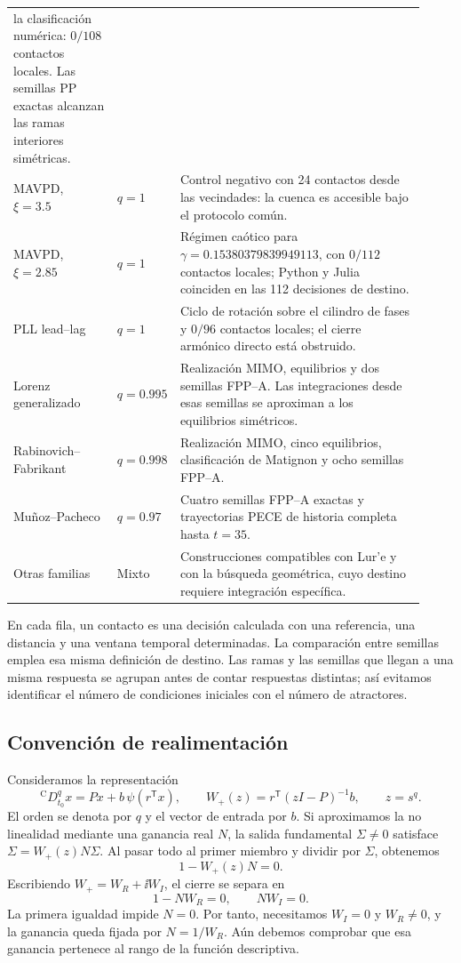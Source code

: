 \begin{longtable}{@{}L{0.25\linewidth}C{0.08\linewidth}L{0.59\linewidth}@{}}
la clasificación numérica: \(0/108\) contactos locales. Las semillas PP
exactas alcanzan las ramas interiores simétricas.\\
MAVPD, \(\xi=3.5\) & \(q=1\) & Control negativo con 24 contactos desde las
vecindades: la cuenca es accesible bajo el protocolo común.\\
MAVPD, \(\xi=2.85\) & \(q=1\) & Régimen caótico para
\(\gamma=0.15380379839949113\), con \(0/112\) contactos locales;
Python y Julia coinciden en las 112 decisiones de destino.\\
PLL lead--lag & \(q=1\) & Ciclo de rotación sobre el cilindro de fases y
\(0/96\) contactos locales; el cierre armónico directo está obstruido.\\
Lorenz generalizado & \(q=0.995\) & Realización MIMO, equilibrios y dos
semillas FPP--A. Las integraciones desde esas semillas se aproximan a los
equilibrios simétricos.\\
Rabinovich--Fabrikant & \(q=0.998\) & Realización MIMO, cinco equilibrios,
clasificación de Matignon y ocho semillas FPP--A.\\
Muñoz--Pacheco & \(q=0.97\) & Cuatro semillas FPP--A exactas y
trayectorias PECE de historia completa hasta \(t=35\).\\
Otras familias & Mixto & Construcciones compatibles con Lur'e y con la
búsqueda geométrica, cuyo destino requiere integración específica.\\
\bottomrule
\end{longtable}

En cada fila, un contacto es una decisión calculada con una referencia,
una distancia y una ventana temporal determinadas. La comparación entre
semillas emplea esa misma definición de destino. Las ramas y las semillas
que llegan a una misma respuesta se agrupan antes de contar respuestas
distintas; así evitamos identificar el número de condiciones iniciales con
el número de atractores.

\subsection{Convención de realimentación}

Consideramos la representación
\begin{equation}
 {}^{\mathrm C}D_{t_0}^{q}x=Px+b\,\psi(r^{\mathsf T}x),\qquad
 W_+(z)=r^{\mathsf T}(zI-P)^{-1}b,\qquad z=s^q.
 \label{eq:master-wplus}
\end{equation}
El orden se denota por \(q\) y el vector de entrada por \(b\). Si aproximamos
la no linealidad mediante una ganancia real \(N\), la salida fundamental
\(\Sigma\ne0\) satisface \(\Sigma=W_+(z)N\Sigma\). Al pasar todo al
primer miembro y dividir por \(\Sigma\), obtenemos
\begin{equation}
 1-W_+(z)N=0.
 \label{eq:master-closure}
\end{equation}
Escribiendo \(W_+=W_R+\ii W_I\), el cierre se separa en
\[
 1-NW_R=0,\qquad NW_I=0.
\]
La primera igualdad impide \(N=0\). Por tanto, necesitamos \(W_I=0\) y
\(W_R\ne0\), y la ganancia queda fijada por \(N=1/W_R\). Aún debemos
comprobar que esa ganancia pertenece al rango de la función descriptiva.

